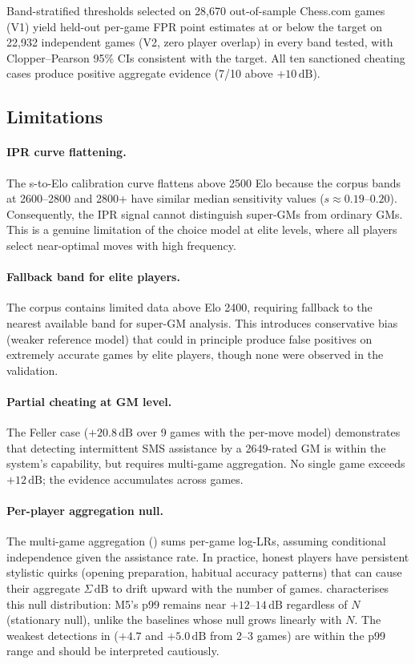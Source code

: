 \documentclass[11pt,a4paper]{article}
\newcommand{\dB}{\,\mathrm{dB}}
\theoremstyle{definition}
\begin{document}
Band-stratified thresholds selected on 28{,}670 out-of-sample
Chess.com games (V1) yield held-out per-game FPR point estimates at
or below the target on 22{,}932 independent games (V2, zero player
overlap) in every band tested, with Clopper--Pearson 95\% CIs
consistent with the target.
All ten sanctioned cheating cases produce positive aggregate
evidence (7/10 above $+10\dB$).

\subsection{Limitations}

\paragraph{IPR curve flattening.}
The s-to-Elo calibration curve flattens above 2500 Elo because the
corpus bands at 2600--2800 and 2800+ have similar median sensitivity
values ($s \approx 0.19$--$0.20$).  Consequently, the IPR signal cannot
distinguish super-GMs from ordinary GMs.  This is a genuine limitation
of the choice model at elite levels, where all players select
near-optimal moves with high frequency.

\paragraph{Fallback band for elite players.}
The corpus contains limited data above Elo 2400, requiring fallback to
the nearest available band for super-GM analysis.  This introduces
conservative bias (weaker reference model) that could in principle
produce false positives on extremely accurate games by elite players,
though none were observed in the validation.

\paragraph{Partial cheating at GM level.}
The Feller case ($+20.8\dB$ over 9 games with the per-move model)
demonstrates that detecting intermittent SMS assistance by a 2649-rated
GM is within the system's capability, but requires multi-game
aggregation.  No single game exceeds $+12\dB$; the evidence accumulates
across games.

\paragraph{Per-player aggregation null.}
The multi-game aggregation () sums per-game
log-LRs, assuming conditional independence given the assistance rate.
In practice, honest players have persistent stylistic quirks (opening
preparation, habitual accuracy patterns) that can cause their aggregate
$\Sigma\dB$ to drift upward with the number of games.
 characterises this null distribution: M5's p99
remains near $+12$--$14\dB$ regardless of $N$ (stationary null),
unlike the baselines whose null grows linearly with $N$.
The weakest detections in  ($+4.7$ and $+5.0\dB$
from 2--3 games) are within the p99 range and should be interpreted
cautiously.
\end{document}
